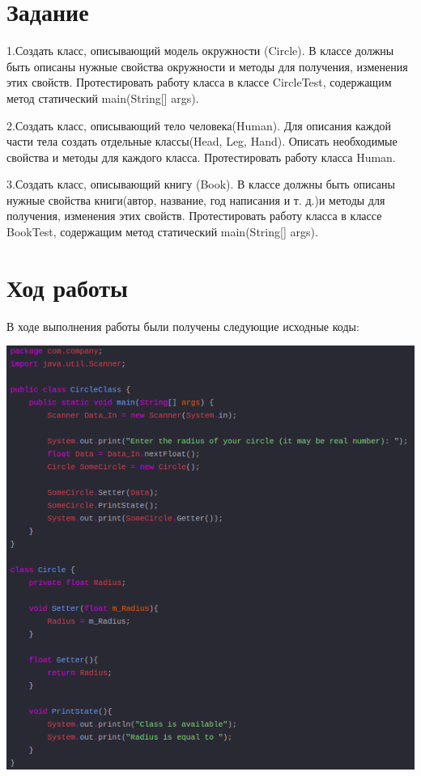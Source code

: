 \documentclass{article}
\begin{document}


\section{Задание}

1.Создать класс, описывающий модель окружности (Circle). В классе должны быть описаны нужные свойства окружности и методы для получения, изменения этих свойств. Протестировать работу класса в классе CircleTest, содержащим метод статический main(String[] args).

2.Создать класс, описывающий тело человека(Human). Для описания каждой части тела создать отдельные классы(Head, Leg, Hand). Описать необходимые свойства и методы для каждого класса. Протестировать работу класса Human.

3.Создать класс, описывающий книгу (Book). В классе должны быть описаны нужные свойства книги(автор, название, год написания и т. д.)и методы для получения, изменения этих свойств. Протестировать работу класса в классе BookTest, содержащим метод статический main(String[] args).

\section{Ход работы}

В ходе выполнения работы были получены следующие исходные коды:

\includegraphics[width=0.85\linewidth]{view1.png}
\end{document}
